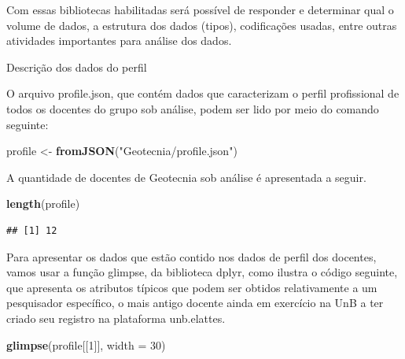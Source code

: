 \documentclass[]{article}
\newenvironment{Shaded}{\begin{snugshade}}{\end{snugshade}}
\newcommand{\DataTypeTok}[1]{\textcolor[rgb]{0.13,0.29,0.53}{#1}}
\newcommand{\DecValTok}[1]{\textcolor[rgb]{0.00,0.00,0.81}{#1}}
\newcommand{\KeywordTok}[1]{\textcolor[rgb]{0.13,0.29,0.53}{\textbf{#1}}}
\newcommand{\NormalTok}[1]{#1}
\newcommand{\StringTok}[1]{\textcolor[rgb]{0.31,0.60,0.02}{#1}}
\begin{document}
Com essas bibliotecas habilitadas será possível de responder e
determinar qual o volume de dados, a estrutura dos dados (tipos),
codificações usadas, entre outras atividades importantes para análise
dos dados.

Descrição dos dados do perfil

O arquivo profile.json, que contém dados que caracterizam o perfil
profissional de todos os docentes do grupo sob análise, podem ser lido
por meio do comando seguinte:

\begin{Shaded}
\begin{Highlighting}[]
\NormalTok{profile <-}\StringTok{ }\KeywordTok{fromJSON}\NormalTok{(}\StringTok{"Geotecnia/profile.json"}\NormalTok{)}
\end{Highlighting}
\end{Shaded}

A quantidade de docentes de Geotecnia sob análise é apresentada a
seguir.

\begin{Shaded}
\begin{Highlighting}[]
\KeywordTok{length}\NormalTok{(profile)}
\end{Highlighting}
\end{Shaded}

\begin{verbatim}
## [1] 12
\end{verbatim}

Para apresentar os dados que estão contido nos dados de perfil dos
docentes, vamos usar a função glimpse, da biblioteca dplyr, como ilustra
o código seguinte, que apresenta os atributos típicos que podem ser
obtidos relativamente a um pesquisador específico, o mais antigo docente
ainda em exercício na UnB a ter criado seu registro na plataforma
unb.elattes.

\begin{Shaded}
\begin{Highlighting}[]
\KeywordTok{glimpse}\NormalTok{(profile[[}\DecValTok{1}\NormalTok{]], }\DataTypeTok{width =} \DecValTok{30}\NormalTok{)}
\end{Highlighting}
\end{Shaded}
\end{document}
